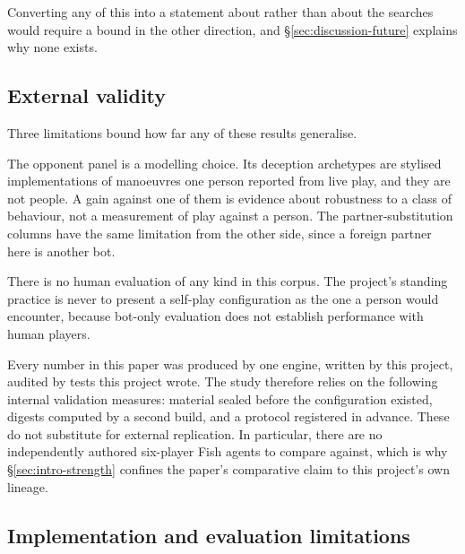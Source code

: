 Converting any of this into a statement about \sestina{} rather than about the searches would
require a bound in the other direction, and \S\ref{sec:discussion-future} explains why none exists.

\subsection{External validity}
\label{sec:discussion-external}

Three limitations bound how far any of these results generalise.

The opponent panel is a modelling choice. Its deception archetypes are stylised implementations of
manoeuvres one person reported from live play, and they are not people. A gain against one of them is
evidence about robustness to a class of behaviour, not a measurement of play against a person. The
partner-substitution columns have the same limitation from the other side, since a foreign partner
here is another bot.

There is no human evaluation of any kind in this corpus. The project's standing practice is never to
present a self-play configuration as the one a person would encounter, because bot-only evaluation
does not establish performance with human players.

Every number in this paper was produced by one engine, written by this project, audited by tests this
project wrote. The study therefore relies on the following internal validation measures: material
sealed before the configuration existed, digests computed by a second build, and a protocol
registered in advance. These do not substitute for external replication. In particular, there are no independently authored
six-player Fish agents to compare against, which is why \S\ref{sec:intro-strength} confines the
paper's comparative claim to this project's own lineage.

\subsection{Implementation and evaluation limitations}
\label{sec:discussion-engineering}

